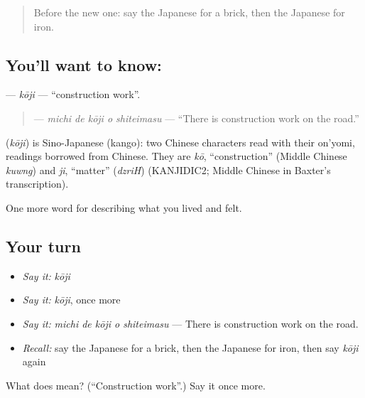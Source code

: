 \label{lesson:JA-C488-kouji}



\begin{quote}
Before the new one: say the Japanese for a brick, then the Japanese for iron.
\end{quote}

\subsection*{You'll want to know: }
\textbf{} — \emph{kōji} — \textquotedblleft{}construction work\textquotedblright{}.

\begin{quote}
\textbf{  } — \emph{michi de kōji o shiteimasu} — \textquotedblleft{}There is construction work on the road.\textquotedblright{}
\end{quote}

\begin{cousinweb}
\textbf{} (\emph{kōji}) is Sino-Japanese (kango): two Chinese characters read with their on'yomi, readings borrowed from Chinese. They are \emph{kō}, \textquotedblleft{}construction\textquotedblright{} (Middle Chinese \emph{kuwng}) and \emph{ji}, \textquotedblleft{}matter\textquotedblright{} (\emph{dzriH}) (KANJIDIC2; Middle Chinese in Baxter's transcription).
\end{cousinweb}

\begin{grammarlens}[title={What you've built}]
One more word for describing what you lived and felt.
\end{grammarlens}

\subsection*{Your turn}
\begin{itemize}
\raggedright
  \item \emph{Say it:} \emph{kōji}
  \item \emph{Say it:} \emph{kōji}, once more
  \item \emph{Say it:} \emph{michi de kōji o shiteimasu} — There is construction work on the road.
  \item \emph{Recall:} say the Japanese for a brick, then the Japanese for iron, then say \emph{kōji} again
\end{itemize}

\begin{tcolorbox}[breakable,colback=teal!4,colframe=teal!35!black,title={Before you move on}]
What does  mean? (\textquotedblleft{}Construction work\textquotedblright{}.) Say it once more.
\end{tcolorbox}
